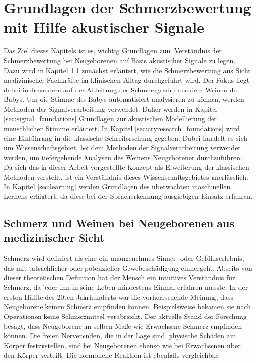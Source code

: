 \chapter{Grundlagen der Schmerzbewertung mit Hilfe akustischer Signale}

Das Ziel dieses Kapitels ist es, wichtig Grundlagen zum Verständnis der Schmerzbewertung bei Neugeborenen auf Basis akustischer Signale zu legen. Dazu wird in Kapitel \ref{sec:medicalFoundations} zunächst erläutert, wie die Schmerzbewertung aus Sicht medizinischer Fachkräfte im klinischen Alltag durchgeführt wird. Der Fokus liegt dabei insbesondere auf der Ableitung des Schmerzgrades aus dem Weinen des Babys. Um die Stimme des Babys automatisiert analysieren zu können, werden Methoden der Signalverarbeitung verwendet. Daher werden in  Kapitel \ref{sec:signal_foundations} Grundlagen zur akustischen Modellierung der menschlichen Stimme erläutert. In Kapitel \ref{sec:cryresearch_foundations} wird eine Einführung in die \glqq klassische Schreiforschung\grqq{} gegeben. Dabei handelt es sich um Wissenschaftsgebiet, bei dem Methoden der Signalverarbeitung verwendet werden, um tiefergehende Analysen des Weinens Neugeborener durchzuführen. Da sich das in dieser Arbeit vorgestellte Konzept als Erweiterung der klassischen Methoden versteht, ist ein Verständnis dieses Wissenschaftsgebietes unerlässlich. In Kapitel \ref{sec:learning} werden Grundlagen des überwachten maschinellen Lernens erläutert, da diese bei der Spracherkennung ausgiebigen Einsatz erfahren. 

\section{Schmerz und Weinen bei Neugeborenen aus medizinischer Sicht}

\label{sec:medicalFoundations} 

Schmerz wird definiert als eine \glqq ein unangenehmes Sinnes- oder Gefühlserlebnis, das mit tatsächlicher oder potenzieller Gewebeschädigung einhergeht\grqq{}.\cite[S. 438]{PainAssessment01} Abseits von dieser theoretischen Definition hat der Mensch ein intuitives Verständnis für Schmerz, da jeder ihn in seine Leben mindestens Einmal erfahren musste. In der ersten Hälfte des 20ten Jahrhunderts war die vorherrschende Meinung, dass Neugeborene keinen Schmerz empfinden können. Beispielsweise bekamen sie nach Operationen keine Schmerzmittel verabreicht. Der aktuelle Stand der Forschung besagt, dass Neugeborene im selben Maße wie Erwachsene Schmerz empfinden können. Die freien Nervenenden, die in der Lage sind, physische Schäden am Körper festzustellen, sind bei Neugeborenen ebenso wie bei Erwachsenen über den Körper verteilt. Die hormonelle Reaktion ist ebenfalls vergleichbar. \cite[S. 402]{PainAssessment03} \cite[S. 438]{PainAssessment01}

